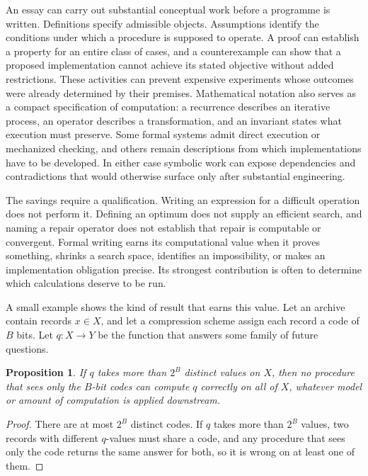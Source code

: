 \documentclass[11pt]{article}
\newtheorem{proposition}{Proposition}
\theoremstyle{remark}
\begin{document}
An essay can carry out substantial conceptual work before a programme is written. Definitions specify admissible objects. Assumptions identify the conditions under which a procedure is supposed to operate. A proof can establish a property for an entire class of cases, and a counterexample can show that a proposed implementation cannot achieve its stated objective without added restrictions. These activities can prevent expensive experiments whose outcomes were already determined by their premises. Mathematical notation also serves as a compact specification of computation: a recurrence describes an iterative process, an operator describes a transformation, and an invariant states what execution must preserve. Some formal systems admit direct execution or mechanized checking, and others remain descriptions from which implementations have to be developed. In either case symbolic work can expose dependencies and contradictions that would otherwise surface only after substantial engineering.

The savings require a qualification. Writing an expression for a difficult operation does not perform it. Defining an optimum does not supply an efficient search, and naming a repair operator does not establish that repair is computable or convergent. Formal writing earns its computational value when it proves something, shrinks a search space, identifies an impossibility, or makes an implementation obligation precise. Its strongest contribution is often to determine which calculations deserve to be run.

A small example shows the kind of result that earns this value. Let an archive contain records $x \in X$, and let a compression scheme assign each record a code of $B$ bits. Let $q : X \to Y$ be the function that answers some family of future questions.

\begin{proposition}
If $q$ takes more than $2^{B}$ distinct values on $X$, then no procedure that sees only the $B$-bit codes can compute $q$ correctly on all of $X$, whatever model or amount of computation is applied downstream.
\end{proposition}

\begin{proof}
There are at most $2^{B}$ distinct codes. If $q$ takes more than $2^{B}$ values, two records with different $q$-values must share a code, and any procedure that sees only the code returns the same answer for both, so it is wrong on at least one of them.
\end{proof}
\end{document}
